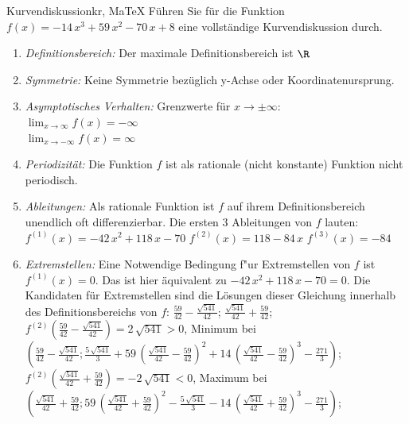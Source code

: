  \providecommand{\MoIl}{(} 
 \providecommand{\MoIr}{)}
 \providecommand{\MIntvlSep}{;} 
 \providecommand{\MElSetSep}{;} 
 \begin{MAufgabe}{Kurvendiskussion}{kr, MaTeX}
 F\"uhren Sie f\"ur die Funktion $f(x)= - 14\, x^3 + 59\, x^2 - 70\, x + 8$ eine vollst\"andige Kurvendiskussion durch.\\ 
 \ifLsg\Loesung
 \begin{enumerate}
 \item \emph{Definitionsbereich:} 
 Der maximale Definitionsbereich ist $\R$\item \emph{Symmetrie:} 
 Keine Symmetrie bez\"uglich y-Achse oder Koordinatenursprung.\item \emph{Asymptotisches Verhalten:} 
 Grenzwerte f\"ur $x\rightarrow \pm \infty$: \\ 
 $\lim_{x\rightarrow \infty} f(x)=- \infty$ \\ 
 $\lim_{x\rightarrow -\infty} f(x)=\infty$ \\ 
 \item \emph{Periodizit\"at:} 
 Die Funktion $f$ ist als rationale (nicht konstante) Funktion nicht periodisch.\item \emph{Ableitungen:} 
 Als rationale Funktion ist $f$ auf ihrem Definitionsbereich unendlich oft differenzierbar. 
 Die ersten 3 Ableitungen von $f$ lauten: \\ 
 $f^{(1)}(x)= - 42\, x^2 + 118\, x - 70$\newline 
  $f^{(2)}(x)=118 - 84\, x$\newline 
  $f^{(3)}(x)=-84$\newline 
  \item \emph{Extremstellen:} 
 Eine Notwendige Bedingung f"ur Extremstellen von $f$ ist $f^{(1)}(x)=0$. 
 Das ist hier \"aquivalent zu $ - 42\, x^2 + 118\, x - 70=0$. 
 Die Kandidaten f\"ur Extremstellen sind die L\"osungen dieser Gleichung innerhalb des Definitionsbereichs von $f$: $\frac{59}{42} - \frac{\sqrt{541}}{42}$; $\frac{\sqrt{541}}{42} + \frac{59}{42}$; \\ 
 $f^{(2)}(\frac{59}{42} - \frac{\sqrt{541}}{42})=2\, \sqrt{541}$$>0$, Minimum bei $(\frac{59}{42} - \frac{\sqrt{541}}{42};\frac{5\, \sqrt{541}}{3} + 59\, {\left(\frac{\sqrt{541}}{42} - \frac{59}{42}\right)}^2 + 14\, {\left(\frac{\sqrt{541}}{42} - \frac{59}{42}\right)}^3 - \frac{271}{3})$; \\ 
 $f^{(2)}(\frac{\sqrt{541}}{42} + \frac{59}{42})=- 2\, \sqrt{541}$$<0$, Maximum bei $(\frac{\sqrt{541}}{42} + \frac{59}{42};59\, {\left(\frac{\sqrt{541}}{42} + \frac{59}{42}\right)}^2 - \frac{5\, \sqrt{541}}{3} - 14\, {\left(\frac{\sqrt{541}}{42} + \frac{59}{42}\right)}^3 - \frac{271}{3})$; \\ 

\end{enumerate}
\end{MAufgabe}
